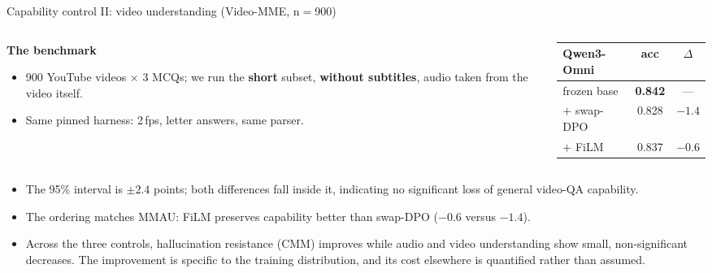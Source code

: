 \documentclass[aspectratio=169,11pt]{beamer}
\begin{document}
\begin{frame}{Capability control II: video understanding (Video-MME, n$=$900)}
\begin{columns}[T]
\begin{column}{0.5\textwidth}\footnotesize
\textbf{The benchmark}
\begin{itemize}\footnotesize
\item 900 YouTube videos $\times$ 3 MCQs; we run the \textbf{short} subset, \textbf{without
subtitles}, audio taken from the video itself.
\item Same pinned harness: 2\,fps, letter answers, same parser.
\end{itemize}
\end{column}
\begin{column}{0.5\textwidth}
\centering
\renewcommand{\arraystretch}{1.2}
\footnotesize
\begin{tabular}{l c c}
\toprule
Qwen3-Omni & acc & $\Delta$ \\
\midrule
frozen base  & \textbf{0.842} & --- \\
$+$ swap-DPO & 0.828 & $-1.4$ \\
$+$ FiLM     & 0.837 & $-0.6$ \\
\bottomrule
\end{tabular}
\end{column}
\end{columns}
\vfill
\begin{itemize}\footnotesize
\item The 95\% interval is $\pm2.4$ points; both differences fall inside it, indicating no
significant loss of general video-QA capability.
\item The ordering matches MMAU: FiLM preserves capability better than swap-DPO ($-0.6$ versus
$-1.4$).
\item Across the three controls, hallucination resistance (CMM) improves while audio and video
understanding show small, non-significant decreases. The improvement is specific to the training
distribution, and its cost elsewhere is quantified rather than assumed.
\end{itemize}
\end{frame}

\end{document}

